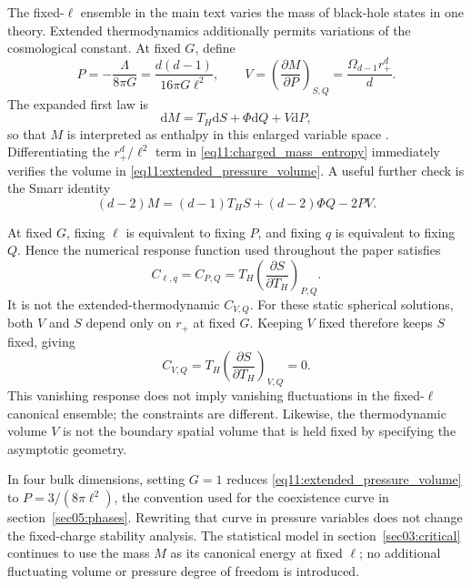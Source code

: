 \documentclass[11pt,letterpaper]{article}
\newcommand{\dd}{\mathrm{d}}
\theoremstyle{plain}
\theoremstyle{definition}
\theoremstyle{remark}
\begin{document}
The fixed-$\ell$ ensemble in the main text varies the mass of black-hole
states in one theory.  Extended thermodynamics additionally permits
variations of the cosmological constant.  At fixed $G$, define
\begin{equation}
 P=-\frac{\Lambda}{8\pi G}
   =\frac{d(d-1)}{16\pi G\ell^2},\qquad
 V=\left(\frac{\partial M}{\partial P}\right)_{S,Q}
   =\frac{\Omega_{d-1}r_+^d}{d}.
 \label{eq11:extended_pressure_volume}
\end{equation}
The expanded first law is
\begin{equation}
 \dd M=T_H\dd S+\Phi\dd Q+V\dd P,
 \label{eq11:extended_first_law}
\end{equation}
so that $M$ is interpreted as enthalpy in this enlarged variable space
\cite{kastor2009,kubiznakmann2012}.  Differentiating the $r_+^d/\ell^2$
term in \eqref{eq11:charged_mass_entropy} immediately verifies the
volume in \eqref{eq11:extended_pressure_volume}.  A useful further
check is the Smarr identity
\begin{equation}
 (d-2)M=(d-1)T_HS+(d-2)\Phi Q-2PV.
 \label{eq11:smarr}
\end{equation}

At fixed $G$, fixing $\ell$ is equivalent to fixing $P$, and fixing $q$
is equivalent to fixing $Q$.  Hence the numerical response function
used throughout the paper satisfies
\begin{equation}
 C_{\ell,q}=C_{P,Q}
    =T_H\left(\frac{\partial S}{\partial T_H}\right)_{P,Q}.
 \label{eq11:capacity_dictionary}
\end{equation}
It is not the extended-thermodynamic $C_{V,Q}$.  For these static
spherical solutions, both $V$ and $S$ depend only on $r_+$ at fixed $G$.
Keeping $V$ fixed therefore keeps $S$ fixed, giving
\begin{equation}
 C_{V,Q}=T_H\left(\frac{\partial S}{\partial T_H}\right)_{V,Q}=0.
 \label{eq11:zero_cv}
\end{equation}
This vanishing response does not imply vanishing fluctuations in the
fixed-$\ell$ canonical ensemble; the constraints are different.
Likewise, the thermodynamic volume $V$ is not the boundary spatial
volume that is held fixed by specifying the asymptotic geometry.

In four bulk dimensions, setting $G=1$ reduces
\eqref{eq11:extended_pressure_volume} to
$P=3/(8\pi\ell^2)$, the convention used for the coexistence curve in
section~\ref{sec05:phases}.  Rewriting that curve in pressure variables
does not change the fixed-charge stability analysis.  The statistical
model in section~\ref{sec03:critical} continues to use the mass $M$ as
its canonical energy at fixed $\ell$; no additional fluctuating volume
or pressure degree of freedom is introduced.
\end{document}
